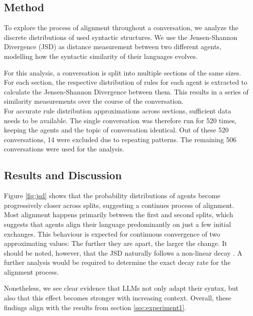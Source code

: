 \documentclass[11pt]{article}
\begin{document}
\subsection{Method}
To explore the process of alignment throughout a conversation, we analyze the discrete distributions of used syntactic structures. We use the Jensen-Shannon Divergence (JSD) as distance measurement between two different agents, modelling how the syntactic similarity of their languages evolves.

For this analysis, a conversation is split into multiple sections of the same sizes.
For each section, the respective distribution of rules for each agent is extracted to calculate the Jensen-Shannon Divergence between them. This results in a series of similarity measurements over the course of the conversation.\\
For accurate rule distribution approximations across sections, sufficient data needs to be available.
The single conversation was therefore run for 520 times, keeping the agents and the topic of conversation identical.
Out of these 520 conversations, 14 were excluded due to repeating patterns. The remaining 506 conversations were used for the analysis.

\subsection{Results and Discussion}
Figure \ref{fig:jsd} shows that the probability distributions of agents become progressively closer across splits, suggesting a continues process of alignment.
Most alignment happens primarily between the first and second splits, which suggests that agents align their language predominantly on just a few initial exchanges.
This behaviour is expected for continuous convergence of two approximating values: The further they are apart, the larger the change. It should be noted, however, that the JSD naturally follows a non-linear decay \cite{lin1991divergence}. A further analysis would be required to determine the exact decay rate for the alignment process.

Nonetheless, we see clear evidence that LLMs not only adapt their syntax, but also that this effect becomes stronger with increasing context.
Overall, these findings align with the results from section \ref{sec:experiment1}.
\end{document}
